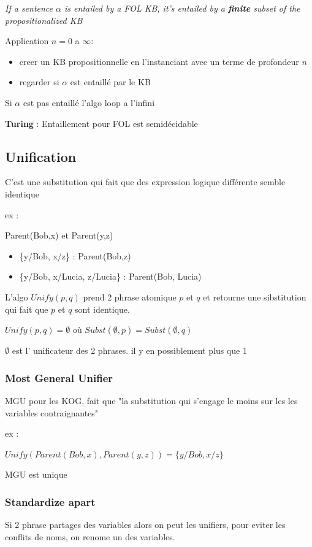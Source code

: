 \documentclass[12pt]{article}
\begin{document}
			\textit{If a sentence $\alpha$ is entailed by a FOL KB, it's entailed by a \textbf{finite} subset of the propositionalized KB}
			
			Application $n=0$ a $\infty$:
			\begin{itemize}
				\item creer un KB propositionnelle en l'instanciant avec un terme de profondeur $n$
				\item regarder si $\alpha$ est entaillé par le KB
			\end{itemize}
			
			Si $\alpha$ est pas entaillé l'algo loop a l'infini
			
			\textbf{Turing} : Entaillement pour FOL est semidécidable
			
	\subsection{Unification}
		C'est une substitution qui fait que des expression logique différente semble identique
		
		ex : 
		
		Parent(Bob,x) et Parent(y,z)
		\begin{itemize}
			\item \{y/Bob, x/z\} : Parent(Bob,z)
			\item \{y/Bob, x/Lucia, z/Lucia\} : Parent(Bob, Lucia)
		\end{itemize}	
		
		L'algo $Unify(p,q)$ prend 2 phrase atomique $p$ et $q$ et retourne une sibstitution qui fait que $p$ et $q$ sont identique.
		
		$Unify(p,q) = \emptyset$ où $Subst(\emptyset, p) = Subst(\emptyset, q)$
		
		$\emptyset$ est l' unificateur des 2 phrases. il y en possiblement plus que 1
		
		\subsubsection{Most General Unifier}
			MGU pour les KOG, fait que "la substitution qui s'engage le moins sur les les variables contraignantes"
			
			ex : 
			
			$Unify(Parent(Bob,x),Parent(y,z)) = \{y/Bob, x/z\}$
			
			MGU est unique
			
		
		\subsubsection{Standardize apart}
			Si 2 phrase partages des variables alors on peut les unifiers, pour eviter les conflits de noms, on renome un des variables.
			
\end{document}
